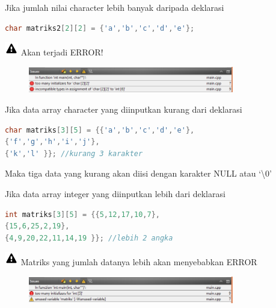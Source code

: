 Jika jumlah nilai character lebih banyak daripada deklarasi

\begin{lstlisting}[language=c++, numbers=none]
char matriks2[2][2] = {'a','b','c','d','e'};
\end{lstlisting}

\includegraphics{../manuscript/images/warning.PNG} Akan terjadi ERROR!

\begin{figure}[htbp]
\centering
\includegraphics[width=0.8\textwidth]{../manuscript/images/capture3-10.PNG}

\end{figure}

Jika data array character yang diinputkan kurang dari deklarasi

\begin{lstlisting}[language=c++, numbers=none]
char matriks[3][5] = {{'a','b','c','d','e'},
{'f','g','h','i','j'},
{'k','l' }}; //kurang 3 karakter
\end{lstlisting}

Maka tiga data yang kurang akan diisi dengan karakter NULL atau `\textbackslash{}0'

Jika data array integer yang diinputkan lebih dari deklarasi

\begin{lstlisting}[language=c++, numbers=none]
int matriks[3][5] = {{5,12,17,10,7},
{15,6,25,2,19},
{4,9,20,22,11,14,19 }}; //lebih 2 angka
\end{lstlisting}

\includegraphics{../manuscript/images/warning.PNG} Matriks yang jumlah datanya lebih akan menyebabkan ERROR


\begin{figure}
	\centering
\includegraphics[width=0.8\textwidth]{../manuscript/images/capture3-9.PNG}
\end{figure}




